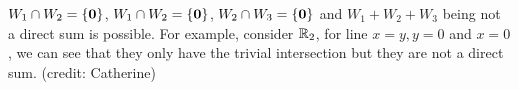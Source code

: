 \begin{remark}
    $W_1 \cap W_2 = \left\{ \mathbf 0 \right\}$, $W_1 \cap W_2 = \left\{ \mathbf 0 \right\}$, $W_2 \cap W_3 = \left\{ \mathbf 0 \right\}$ and $W_1 + W_2 + W_3$ being not a direct sum is possible. For example, consider $\mathbb R_2$, for line $x = y, y = 0$ and $x = 0$, we can see that they only have the trivial intersection but they are not a direct sum. (credit: Catherine)
\end{remark}
\newpage 